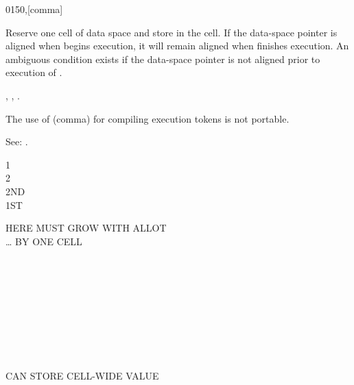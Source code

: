 \begin{worddef}{0150}{,}[comma]
\item {}

	Reserve one cell of data space and store  in the cell.
	If the data-space pointer is aligned when \word{,} begins
	execution, it will remain aligned when \word{,} finishes
	execution. An ambiguous condition exists if the data-space
	pointer is not aligned prior to execution of \word{,}.

\see {},
	,
	.

	\begin{rationale} %
		The use of \word{,} (comma) for compiling execution tokens is
		not portable.

		See: .
	\end{rationale}

	\begin{testing} %
		\ttfamily
		 1 \word{,} \\
		 2 \word{,} \\
		 2ND \\
		 1ST

		  HERE MUST GROW WITH ALLOT \\
		     {\ldots} BY ONE CELL \\
		 \\
		 \\
		 \\
		 \\
		 \\
		 \\
		 \\
		 \\
		 \\
		 \tab {} CAN STORE CELL-WIDE VALUE
	\end{testing}
\end{worddef}


